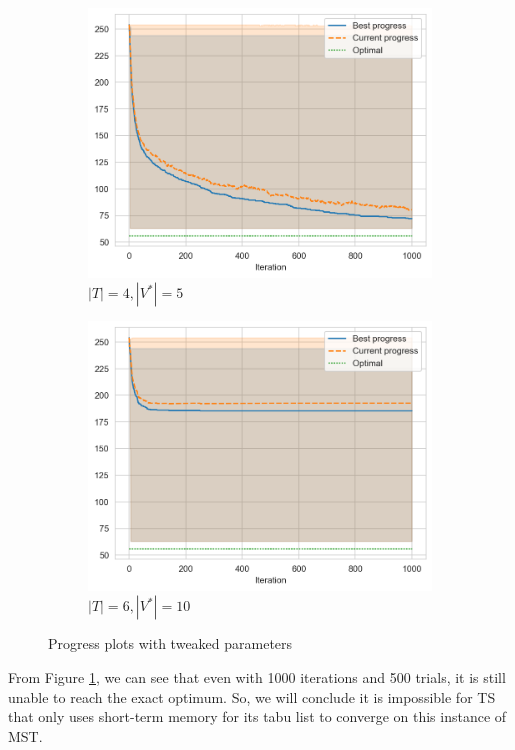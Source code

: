 \begin{figure}[ht]
    \centering
    \hfill
    \begin{subfigure}{0.45\textwidth}
        \centering
        \includegraphics[width=\textwidth]{../images/p2/small-incr.png}
        \caption{\(|T| = 4, |V^*| = 5\)}
    \end{subfigure}
    \hfill
    \begin{subfigure}{0.45\textwidth}
        \centering
        \includegraphics[width=\textwidth]{../images/p2/large-incr.png}
        \caption{\(|T| = 6, |V^*| = 10\)}
    \end{subfigure}
    \hfill
    \caption{Progress plots with tweaked parameters}
    \label{fig:p2-tweaked}
\end{figure}

From Figure \ref{fig:p2-tweaked}, we can see that even with 1000 iterations and 500 trials, it is still unable to reach the exact optimum. So, we will conclude it is impossible for TS that only uses short-term memory for its tabu list to converge on this instance of MST.

